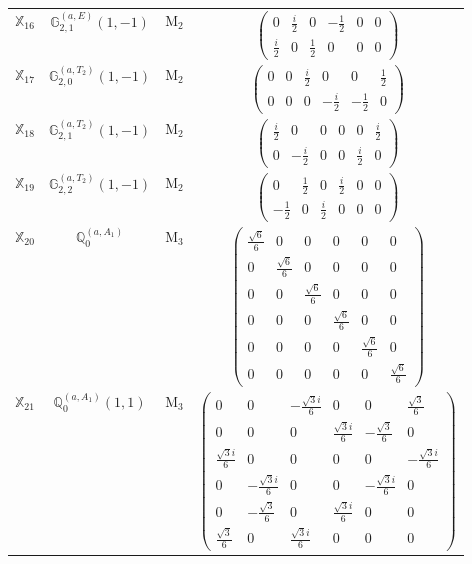 \documentclass[fleqn,10pt,landscape]{article}
\begin{document}
\begin{itemize}
\begin{center}
\begin{longtable}{c|c|c|c}
$ \mathbb{X}_{16} $ & $\mathbb{G}_{2,1}^{(a,E)}(1,-1)$ & M$_{2}$ & $\begin{pmatrix} 0 & \frac{i}{2} & 0 & - \frac{1}{2} & 0 & 0 \\ \frac{i}{2} & 0 & \frac{1}{2} & 0 & 0 & 0 \end{pmatrix}$ \\
$ \mathbb{X}_{17} $ & $\mathbb{G}_{2,0}^{(a,T_{2})}(1,-1)$ & M$_{2}$ & $\begin{pmatrix} 0 & 0 & \frac{i}{2} & 0 & 0 & \frac{1}{2} \\ 0 & 0 & 0 & - \frac{i}{2} & - \frac{1}{2} & 0 \end{pmatrix}$ \\
$ \mathbb{X}_{18} $ & $\mathbb{G}_{2,1}^{(a,T_{2})}(1,-1)$ & M$_{2}$ & $\begin{pmatrix} \frac{i}{2} & 0 & 0 & 0 & 0 & \frac{i}{2} \\ 0 & - \frac{i}{2} & 0 & 0 & \frac{i}{2} & 0 \end{pmatrix}$ \\
$ \mathbb{X}_{19} $ & $\mathbb{G}_{2,2}^{(a,T_{2})}(1,-1)$ & M$_{2}$ & $\begin{pmatrix} 0 & \frac{1}{2} & 0 & \frac{i}{2} & 0 & 0 \\ - \frac{1}{2} & 0 & \frac{i}{2} & 0 & 0 & 0 \end{pmatrix}$ \\ \hline
$ \mathbb{X}_{20} $ & $\mathbb{Q}_{0}^{(a,A_{1})}$ & M$_{3}$ & $\begin{pmatrix} \frac{\sqrt{6}}{6} & 0 & 0 & 0 & 0 & 0 \\ 0 & \frac{\sqrt{6}}{6} & 0 & 0 & 0 & 0 \\ 0 & 0 & \frac{\sqrt{6}}{6} & 0 & 0 & 0 \\ 0 & 0 & 0 & \frac{\sqrt{6}}{6} & 0 & 0 \\ 0 & 0 & 0 & 0 & \frac{\sqrt{6}}{6} & 0 \\ 0 & 0 & 0 & 0 & 0 & \frac{\sqrt{6}}{6} \end{pmatrix}$ \\
$ \mathbb{X}_{21} $ & $\mathbb{Q}_{0}^{(a,A_{1})}(1,1)$ & M$_{3}$ & $\begin{pmatrix} 0 & 0 & - \frac{\sqrt{3} i}{6} & 0 & 0 & \frac{\sqrt{3}}{6} \\ 0 & 0 & 0 & \frac{\sqrt{3} i}{6} & - \frac{\sqrt{3}}{6} & 0 \\ \frac{\sqrt{3} i}{6} & 0 & 0 & 0 & 0 & - \frac{\sqrt{3} i}{6} \\ 0 & - \frac{\sqrt{3} i}{6} & 0 & 0 & - \frac{\sqrt{3} i}{6} & 0 \\ 0 & - \frac{\sqrt{3}}{6} & 0 & \frac{\sqrt{3} i}{6} & 0 & 0 \\ \frac{\sqrt{3}}{6} & 0 & \frac{\sqrt{3} i}{6} & 0 & 0 & 0 \end{pmatrix}$ \\

\end{longtable}
\end{center}
\end{itemize}
\end{document}
